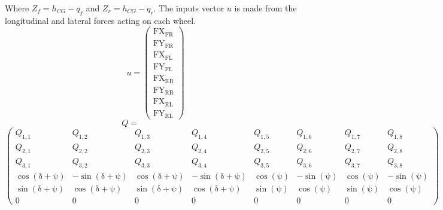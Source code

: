 Where $Z_f = h_{CG}-q_f$ and $Z_r = h_{CG}-q_r$.
The inputs vector $u$ is made from the longitudinal and lateral forces acting on each wheel.
$$
u = \left(\begin{array}{c} \mathrm{FX}_{\mathrm{FR}}\\ \mathrm{FY}_{\mathrm{FR}}\\ \mathrm{FX}_{\mathrm{FL}}\\ \mathrm{FY}_{\mathrm{FL}}\\ \mathrm{FX}_{\mathrm{RR}}\\ \mathrm{FY}_{\mathrm{RR}}\\ \mathrm{FX}_{\mathrm{RL}}\\ \mathrm{FY}_{\mathrm{RL}} \end{array}\right)
$$
$$
Q = \quad\quad\quad\quad\quad\quad
$$
$$
\left(\begin{array}{cccccccc} Q_{1,1} & Q_{1,2} & Q_{1,3} & Q_{1,4} & Q_{1,5} & Q_{1,6} & Q_{1,7} & Q_{1,8}\\ Q_{2,1} & Q_{2,2} & Q_{2,3} & Q_{2,4} & Q_{2,5} & Q_{2,6} & Q_{2,7} & Q_{2,8}\\ Q_{3,1} & Q_{3,2} & Q_{3,3} & Q_{3,4} & Q_{3,5} & Q_{3,6} & Q_{3,7} & Q_{3,8}\\ \cos\left(\mathrm{\delta}+\mathrm{\psi}\right) & -\sin\left(\mathrm{\delta}+\mathrm{\psi}\right) & \cos\left(\mathrm{\delta}+\mathrm{\psi}\right) & -\sin\left(\mathrm{\delta}+\mathrm{\psi}\right) & \cos\left(\mathrm{\psi}\right) & -\sin\left(\mathrm{\psi}\right) & \cos\left(\mathrm{\psi}\right) & -\sin\left(\mathrm{\psi}\right)\\ \sin\left(\mathrm{\delta}+\mathrm{\psi}\right) & \cos\left(\mathrm{\delta}+\mathrm{\psi}\right) & \sin\left(\mathrm{\delta}+\mathrm{\psi}\right) & \cos\left(\mathrm{\delta}+\mathrm{\psi}\right) & \sin\left(\mathrm{\psi}\right) & \cos\left(\mathrm{\psi}\right) & \sin\left(\mathrm{\psi}\right) & \cos\left(\mathrm{\psi}\right)\\ 0 & 0 & 0 & 0 & 0 & 0 & 0 & 0 \end{array}\right)
$$

